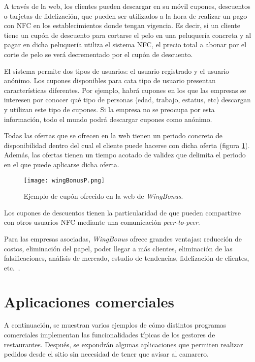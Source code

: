   A través de la web, los clientes pueden descargar en su móvil cupones, 
  descuentos o tarjetas de fidelización, que pueden ser utilizados a la hora 
  de realizar un pago con \acs{NFC} en los establecimientos donde tengan 
  vigencia. Es decir, si un cliente tiene un cupón de descuento para cortarse 
  el pelo en una peluquería concreta y al pagar en dicha peluquería utiliza el 
  sistema \acs{NFC}, el precio total a abonar por el corte de pelo se verá 
  decrementado por el cupón de descuento.

  El sistema permite dos tipos de usuarios: el usuario registrado y el usuario
  anónimo. Los cupones disponibles para cata tipo de usuario presentan
  características diferentes. Por ejemplo, habrá cupones en los que las
  empresas se interesen por conocer qué tipo de personas (edad, trabajo,
  estatus, etc) descargan y utilizan este tipo de cupones. Si la empresa no
  se preocupa por esta información, todo el mundo podrá descargar cupones
  como anónimo.

  Todas las ofertas que se ofrecen en la web tienen un periodo concreto de
  disponibilidad dentro del cual el cliente puede hacerse con dicha oferta
  (figura \ref{fig:wingBonusP}). Además, las ofertas tienen un tiempo acotado
  de validez que delimita el periodo en el que puede aplicarse dicha oferta.

  \begin{figure}[!h]
    \begin{center}
      \texttt{[image: wingBonusP.png]}
      \caption{Ejemplo de cupón ofrecido en la web de \emph{WingBonus}.}
      \label{fig:wingBonusP}
    \end{center}
  \end{figure}

  Los cupones de descuentos tienen la particularidad de que pueden compartirse
  con otros usuarios \acs{NFC} mediante una comunicación \emph{peer-to-peer}.

  Para las empresas asociadas, \emph{WingBonus} ofrece grandes ventajas: 
  reducción de costos, eliminación del papel, poder llegar a más clientes,
  eliminación de las falsificaciones, análisis de mercado, estudio de
  tendencias, fidelización de clientes, etc.~\cite{bib:wingBonus}.

  \section{Aplicaciones comerciales}
  A continuación, se muestran varios ejemplos de cómo distintos programas
  comerciales implementan las funcionalidades típicas de los gestores de
  restaurantes. Después, se expondrán algunas aplicaciones que permiten
  realizar pedidos desde el sitio sin necesidad de tener que avisar al
  camarero.

